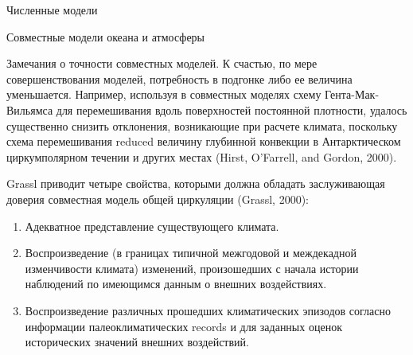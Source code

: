 \begin{chapter}{Численные модели}
\begin{section}{Совместные модели океана и атмосферы}
\begin{paragraph}{Замечания о точности совместных моделей.}
К счастью, по мере совершенствования моделей, потребность в подгонке либо
ее величина уменьшается. Например, используя в совместных моделях
схему Гента-Мак-Вильямса для перемешивания%
вдоль поверхностей постоянной плотности, удалось существенно снизить
отклонения, возникающие при расчете климата, поскольку схема перемешивания%
 reduced величину глубинной
конвекции в Антарктическом циркумполярном течении%
 и других
местах (Hirst, O'Farrell, and Gordon, 2000).
%

Grassl приводит четыре свойства, которыми должна обладать заслуживающая 
доверия совместная модель общей циркуляции (Grassl, 2000):
%
\begin{enumerate}
\item
Адекватное представление существующего климата.
%

\item
Воспроизведение (в границах типичной межгодовой и междекадной изменчивости
климата) изменений, произошедших с начала истории наблюдений по имеющимся
данным о внешних воздействиях.
%

\item
Воспроизведение различных прошедших климатических эпизодов согласно
информации палеоклиматических records и для заданных оценок исторических
значений внешних воздействий.
%


\end{enumerate}
\end{paragraph}
\end{section}
\end{chapter}
